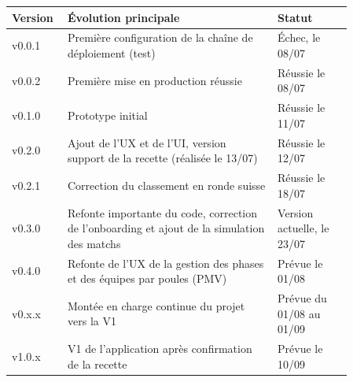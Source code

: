 \begin{table}[H]
    \centering
    \small
    \renewcommand{\arraystretch}{1.4}
    \begin{tabular}{|>{\raggedright\arraybackslash}p{0.10\linewidth}|>{\raggedright\arraybackslash}p{0.56\linewidth}|>{\raggedright\arraybackslash}p{0.20\linewidth}|}
        \hline
        \textbf{Version} & \textbf{Évolution principale} & \textbf{Statut} \\
        \hline
        v0.0.1 & Première configuration de la chaîne de déploiement (test) & Échec, le 08/07 \\
        \hline
        v0.0.2 & Première mise en production réussie & Réussie le 08/07 \\
        \hline
        v0.1.0 & Prototype initial & Réussie le 11/07 \\
        \hline
        v0.2.0 & Ajout de l'UX et de l'UI, version support de la recette (réalisée le 13/07) & Réussie le 12/07 \\
        \hline
        v0.2.1 & Correction du classement en ronde suisse & Réussie le 18/07 \\
        \hline
        v0.3.0 & Refonte importante du code, correction de l'onboarding et ajout de la simulation des matchs & Version actuelle, le 23/07 \\
        \hline
        v0.4.0 & Refonte de l'UX de la gestion des phases et des équipes par poules (PMV) & Prévue le 01/08 \\
        \hline
        v0.x.x & Montée en charge continue du projet vers la V1 & Prévue du 01/08 au 01/09 \\
        \hline
        v1.0.x & V1 de l'application après confirmation de la recette & Prévue le 10/09 \\
        \hline
    \end{tabular}
\end{table}

